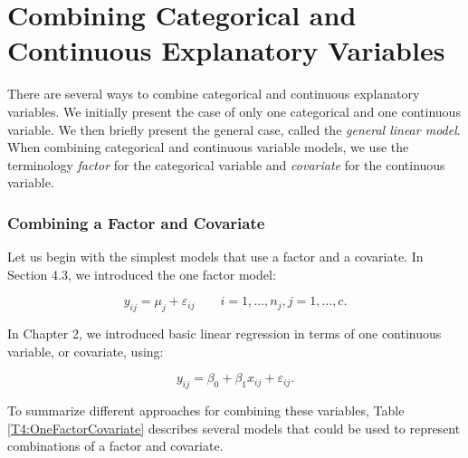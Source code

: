 \section{Combining Categorical and Continuous Explanatory Variables}

There are several ways to combine categorical and continuous
explanatory variables. We initially present the case of only one
categorical and one continuous variable. We then briefly present the
general case, called the \textit{general linear model}. When
combining categorical and continuous variable models, we use the
terminology \emph{factor} for the categorical variable and
\emph{covariate} for the continuous variable.

\subsubsection*{Combining a Factor and Covariate}

Let us begin with the simplest models that use a factor and a
covariate. In Section 4.3, we introduced the one factor model:

\begin{equation*}
y_{ij}=\mu_{j} + \varepsilon_{ij}\qquad i=1,\ldots ,n_{j},\text{
}j=1,\ldots ,c.
\end{equation*}

In Chapter 2, we introduced basic linear regression in terms of one
continuous variable, or covariate, using:

\begin{equation*}
y_{ij}=\beta_0+\beta_1x_{ij} + \varepsilon_{ij}.
\end{equation*}

\noindent To summarize different approaches for combining these
variables, Table \ref{T4:OneFactorCovariate} describes several
models that could be used to represent combinations of a factor and
covariate.

